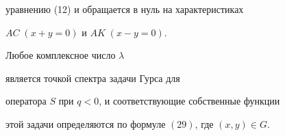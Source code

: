 уравнению (12) и обращается в нуль на характеристиках


$AC\;(x+y=0)$  и $AK\;(x-y=0)$.





\begin{thm}


Любое комплексное число $\lambda$


является точкой спектра задачи Гурса для


оператора $S$ при $q<0$, и соответствующие собственные функции


этой задачи определяются по формуле $(29)$, где $(x,y) \in G.$


\end{thm}





